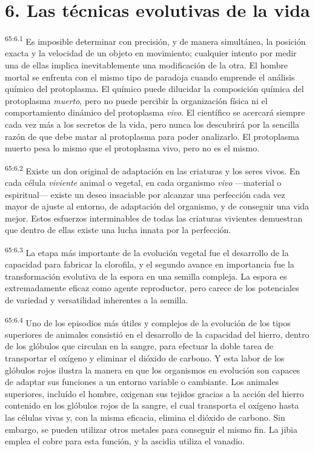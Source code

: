 \section*{6. Las técnicas evolutivas de la vida}
\par
\textsuperscript{65:6.1} Es imposible determinar con precisión, y de manera simultánea, la posición exacta y la velocidad de un objeto en movimiento; cualquier intento por medir una de ellas implica inevitablemente una modificación de la otra. El hombre mortal se enfrenta con el mismo tipo de paradoja cuando emprende el análisis químico del protoplasma. El químico puede dilucidar la composición química del protoplasma \textit{muerto}, pero no puede percibir la organización física ni el comportamiento dinámico del protoplasma \textit{vivo}. El científico se acercará siempre cada vez más a los secretos de la vida, pero nunca los descubrirá por la sencilla razón de que debe matar al protoplasma para poder analizarlo. El protoplasma muerto pesa lo mismo que el protoplasma vivo, pero no es el mismo.

\par
\textsuperscript{65:6.2} Existe un don original de adaptación en las criaturas y los seres vivos. En cada célula \textit{viviente} animal o vegetal, en cada organismo \textit{vivo} ---material o espiritual--- existe un deseo insaciable por alcanzar una perfección cada vez mayor de ajuste al entorno, de adaptación del organismo, y de conseguir una vida mejor. Estos esfuerzos interminables de todas las criaturas vivientes demuestran que dentro de ellas existe una lucha innata por la perfección.

\par
\textsuperscript{65:6.3} La etapa más importante de la evolución vegetal fue el desarrollo de la capacidad para fabricar la clorofila, y el segundo avance en importancia fue la transformación evolutiva de la espora en una semilla compleja. La espora es extremadamente eficaz como agente reproductor, pero carece de los potenciales de variedad y versatilidad inherentes a la semilla.

\par
\textsuperscript{65:6.4} Uno de los episodios más útiles y complejos de la evolución de los tipos superiores de animales consistió en el desarrollo de la capacidad del hierro, dentro de los glóbulos que circulan en la sangre, para efectuar la doble tarea de transportar el oxígeno y eliminar el dióxido de carbono. Y esta labor de los glóbulos rojos ilustra la manera en que los organismos en evolución son capaces de adaptar sus funciones a un entorno variable o cambiante. Los animales superiores, incluído el hombre, oxigenan sus tejidos gracias a la acción del hierro contenido en los glóbulos rojos de la sangre, el cual transporta el oxígeno hasta las células vivas y, con la misma eficacia, elimina el dióxido de carbono. Sin embargo, se pueden utilizar otros metales para conseguir el mismo fin. La jibia emplea el cobre para esta función, y la ascidia utiliza el vanadio.

